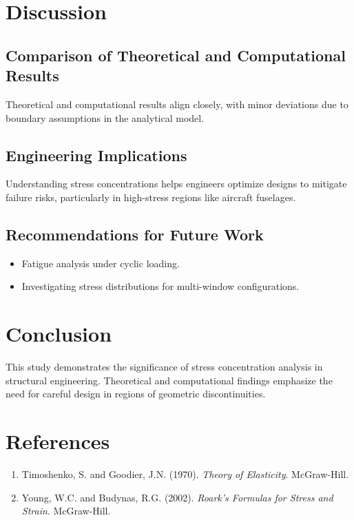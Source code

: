 \documentclass[a4paper,11pt]{article}
\begin{document}
\newpage

\section{Discussion}
\subsection{Comparison of Theoretical and Computational Results}
Theoretical and computational results align closely, with minor deviations due to boundary assumptions in the analytical model.

\subsection{Engineering Implications}
Understanding stress concentrations helps engineers optimize designs to mitigate failure risks, particularly in high-stress regions like aircraft fuselages.

\subsection{Recommendations for Future Work}
\begin{itemize}
    \item Fatigue analysis under cyclic loading.
    \item Investigating stress distributions for multi-window configurations.
\end{itemize}

\newpage

\section{Conclusion}
This study demonstrates the significance of stress concentration analysis in structural engineering. Theoretical and computational findings emphasize the need for careful design in regions of geometric discontinuities.

\section*{References}
\begin{enumerate}
    \item Timoshenko, S. and Goodier, J.N. (1970). \textit{Theory of Elasticity}. McGraw-Hill.
    \item Young, W.C. and Budynas, R.G. (2002). \textit{Roark's Formulas for Stress and Strain}. McGraw-Hill.
\end{enumerate}
\end{document}
